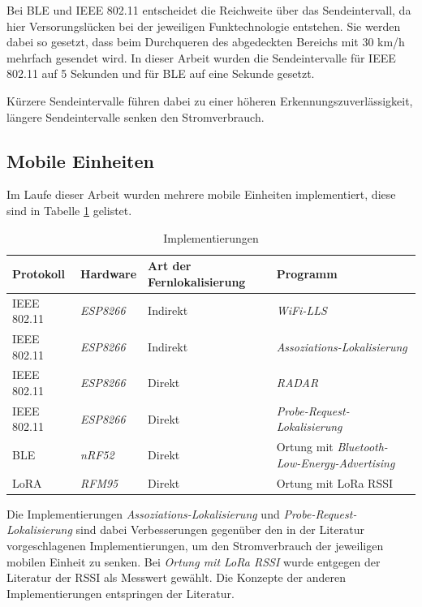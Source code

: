 Bei BLE und IEEE 802.11 entscheidet die Reichweite über das Sendeintervall, da hier Versorungslücken bei der jeweiligen Funktechnologie entstehen.
Sie werden dabei so gesetzt, dass beim Durchqueren des abgedeckten Bereichs mit 30 km/h mehrfach gesendet wird.
In dieser Arbeit wurden die Sendeintervalle für IEEE 802.11 auf 5 Sekunden und für BLE auf eine Sekunde gesetzt.

Kürzere Sendeintervalle führen dabei zu einer höheren Erkennungszuverlässigkeit, längere Sendeintervalle senken den Stromverbrauch.

\subsection{Mobile Einheiten}
Im Laufe dieser Arbeit wurden mehrere mobile Einheiten implementiert, diese sind in Tabelle \ref{table:implemen} gelistet.

\begin{table}[h]
	\centering
	\caption{Implementierungen}
	\label{table:implemen}
	\begin{tabular}{l|l|p{2.5cm}|p{5.8cm}}
		Protokoll & Hardware & Art der Fernlokalisierung & Programm \\
		\hline
		IEEE 802.11 & \emph{ESP8266} & Indirekt & \emph{WiFi-LLS} \cite{chen2007design} \\
		IEEE 802.11 & \emph{ESP8266} & Indirekt & \emph{Assoziations-Lokalisierung} \\
		\hline
		IEEE 802.11 & \emph{ESP8266} & Direkt & \emph{RADAR} \cite{bahl2000radar} \\
		IEEE 802.11 & \emph{ESP8266} & Direkt & \emph{Probe-Request-Lokalisierung} \\
		\hline
		BLE & \emph{nRF52} & Direkt & Ortung mit \emph{Bluetooth-Low-Energy-Advertising} \cite{jianyong2014rssi} \\
		\hline
		LoRA & \emph{RFM95} & Direkt & Ortung mit LoRa RSSI \\
	\end{tabular}
\end{table}

Die Implementierungen \emph{Assoziations-Lokalisierung} und \emph{Probe-Request-Lokalisierung} sind dabei Verbesserungen gegenüber den in der Literatur vorgeschlagenen Implementierungen, um den Stromverbrauch der jeweiligen mobilen Einheit zu senken.
Bei \emph{Ortung mit LoRa RSSI} wurde entgegen der Literatur der RSSI als Messwert gewählt.
Die Konzepte der anderen Implementierungen entspringen der Literatur.

